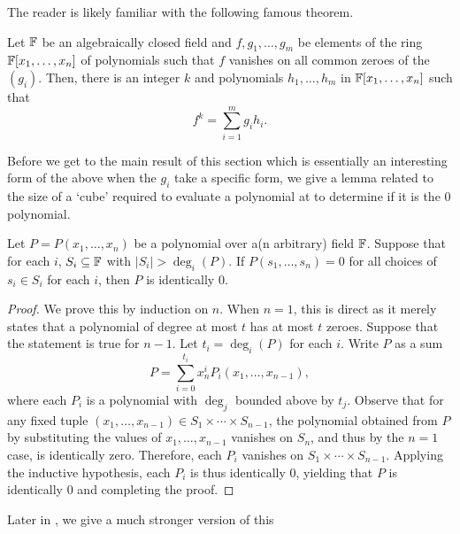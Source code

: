 	The reader is likely familiar with the following famous theorem.

	\begin{ftheo}
		Let $\mathbb{F}$ be an algebraically closed field and $f,g_1,\ldots,g_m$ be elements of the ring $\mathbb{F}[x_1,\ldots,x_n]$ of polynomials such that $f$ vanishes on all common zeroes of the $(g_i)$. Then, there is an integer $k$ and polynomials $h_1,\ldots,h_m$ in $\mathbb{F}[x_1,\ldots,x_n]$ such that
		\[ f^k = \sum_{i=1}^{m} g_i h_i. \]
	\end{ftheo}

	Before we get to the main result of this section which is essentially an interesting form of the above when the $g_i$ take a specific form, we give a lemma related to the size of a `cube' required to evaluate a polynomial at to determine if it is the $0$ polynomial.

	\begin{lemma}
		\label{lem: comb null lem}
		Let $P = P(x_1,\ldots,x_n)$ be a polynomial over a(n arbitrary) field $\mathbb{F}$. Suppose that for each $i$, $S_i \subseteq \mathbb{F}$ with $|S_i| > \deg_i(P)$. If $P(s_1,\ldots,s_n) = 0$ for all choices of $s_i \in S_i$ for each $i$, then $P$ is identically $0$. 
	\end{lemma}
	\begin{proof}
		We prove this by induction on $n$. When $n=1$, this is direct as it merely states that a polynomial of degree at most $t$ has at most $t$ zeroes. Suppose that the statement is true for $n-1$. Let $t_i = \deg_i(P)$ for each $i$. Write $P$ as a sum
		\[ P = \sum_{i=0}^{t_i} x_n^i P_i(x_1,\ldots,x_{n-1}), \]
		where each $P_i$ is a polynomial with $\deg_j$ bounded above by $t_j$. Observe that for any fixed tuple $(x_1,\ldots,x_{n-1}) \in S_1 \times \cdots \times S_{n-1}$, the polynomial obtained from $P$ by substituting the values of $x_1,\ldots,x_{n-1}$ vanishes on $S_n$, and thus by the $n=1$ case, is identically zero. Therefore, each $P_i$ vanishes on $S_1 \times \cdots \times S_{n-1}$. Applying the inductive hypothesis, each $P_i$ is thus identically $0$, yielding that $P$ is identically $0$ and completing the proof.
	\end{proof}

	Later in , we give a much stronger version of this

